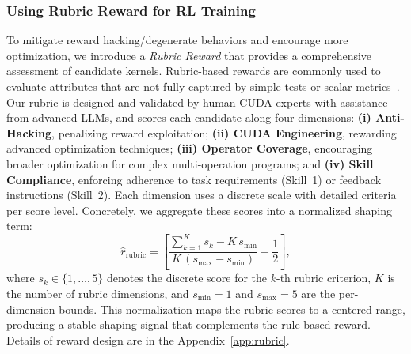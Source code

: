 \subsubsection{Using Rubric Reward for RL Training}

To mitigate reward hacking/degenerate behaviors and encourage more optimization,
we introduce a \emph{Rubric Reward} that provides a comprehensive
assessment of candidate kernels. Rubric-based rewards are commonly used to
evaluate attributes that are not fully captured by simple tests or scalar
metrics~\cite{huang2025reinforcementlearningrubricanchors,liu2026openrubricsscalablesyntheticrubric}.
Our rubric is designed and validated by human CUDA experts with assistance from
advanced LLMs, and scores each candidate along four dimensions: \textbf{(i)
Anti-Hacking}, penalizing reward exploitation; \textbf{(ii) CUDA Engineering},
rewarding advanced optimization techniques; \textbf{(iii) Operator Coverage},
encouraging broader optimization for complex multi-operation programs; and \textbf{(iv)
Skill Compliance}, enforcing adherence to task requirements (Skill~1) or feedback
instructions (Skill~2). Each dimension uses a discrete scale with detailed
criteria per score level. Concretely, we aggregate these scores into a
normalized shaping term:
\begin{equation}
\hat{r}_{\mathrm{rubric}}
=
\left[
\frac{
\sum_{k=1}^{K} s_k- K\,s_{\min}
}{
K\,(s_{\max}-s_{\min})
}
-\frac{1}{2}
\right],
\label{eq:rubric_reward}
\end{equation}
where $s_k \in \{1,\dots,5\}$ denotes the discrete score for the $k$-th rubric
criterion, $K$ is the number of rubric dimensions, and $s_{\min}=1$ and
$s_{\max}=5$ are the per-dimension bounds. This normalization maps the rubric
scores to a centered range, producing a stable shaping signal that complements
the rule-based reward. Details of reward design are in the Appendix~\ref{app:rubric}.













